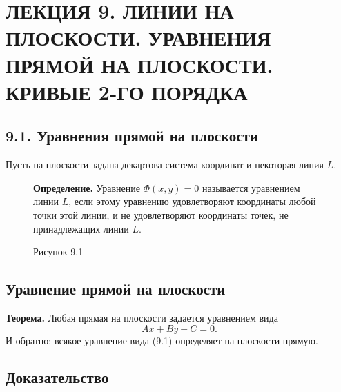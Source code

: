 \documentclass[12pt,a4paper]{article}
\begin{document}
\setcounter{page}{58}

\section*{ЛЕКЦИЯ 9. ЛИНИИ НА ПЛОСКОСТИ. УРАВНЕНИЯ ПРЯМОЙ НА
ПЛОСКОСТИ. КРИВЫЕ 2-ГО ПОРЯДКА}

\subsection*{9.1. Уравнения прямой на плоскости}

Пусть на плоскости задана декартова система координат и некоторая линия $L$.

\begin{figure}[H]
  \centering
  \begin{minipage}{0.4\textwidth}
    \centering
    \caption*{Рисунок 9.1}
  \end{minipage}%
  \begin{minipage}{0.55\textwidth}
    \textbf{Определение.} Уравнение $\Phi(x,y)=0$ называется
    уравнением линии $L$, если этому уравнению удовлетворяют
    координаты любой точки этой линии, и не удовлетворяют координаты
    точек, не принадлежащих линии $L$.
  \end{minipage}
\end{figure}

\subsection*{\textbf{Уравнение прямой на плоскости}}

\textbf{Теорема.} Любая прямая на плоскости задается уравнением вида
\begin{equation}
  Ax+By+C=0. \tag{9.1}
\end{equation}
И обратно: всякое уравнение вида (9.1) определяет на плоскости прямую.

\subsection*{\textbf{Доказательство}}
\end{document}
